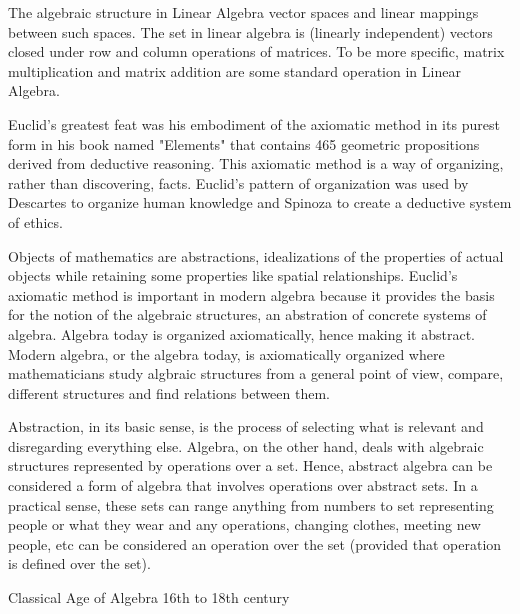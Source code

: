 \documentclass[11pt]{amsart}
\begin{document}
The algebraic structure in Linear Algebra vector spaces and linear mappings between such spaces. The set in linear algebra is (linearly independent) vectors closed under row and column operations of matrices. To be more specific, matrix multiplication and matrix addition are some standard operation in Linear Algebra.

Euclid's greatest feat was his embodiment of the axiomatic method in its purest form in his book named "Elements" that contains 465 geometric propositions derived from deductive reasoning. This axiomatic method is a way of organizing, rather than discovering, facts. Euclid's pattern of organization was used by Descartes to organize human knowledge and Spinoza to create a deductive system of ethics.

Objects of mathematics are abstractions, idealizations of the properties of actual objects while retaining some properties like spatial relationships. Euclid's axiomatic method is important in modern algebra because it provides the basis for the notion of the algebraic structures, an abstration of concrete systems of algebra. Algebra today is organized axiomatically, hence making it abstract. Modern algebra, or the algebra today, is axiomatically organized where mathematicians study algbraic structures from a general point of view, compare, different structures and find relations between them.

Abstraction, in its basic sense, is the process of selecting what is relevant and disregarding everything else. Algebra, on the other hand, deals with algebraic structures represented by operations over a set. Hence, abstract algebra can be considered a form of algebra that involves operations over abstract sets. In a practical sense, these sets can range anything from numbers to set representing people or what they wear and any operations, changing clothes, meeting new people, etc can be considered an operation over the set (provided that operation is defined over the set).



Classical Age of Algebra
16th to 18th century
\end{document}
